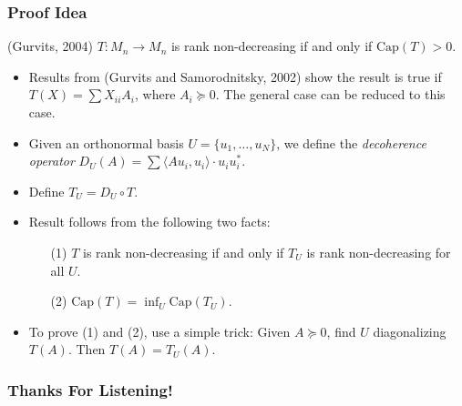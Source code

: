\documentclass[usenames,dvipsnames,12pt]{beamer}
\begin{document}
\begin{frame}
    \frametitle{Proof Idea}

    (Gurvits, 2004) $T: M_n \to M_n$ is rank non-decreasing if and only if $\text{Cap}(T) > 0$.

    \begin{itemize}
        \pause
        \item Results from (Gurvits and Samorodnitsky, 2002) show the result is true if $T(X) = \sum X_{ii} A_i$, where $A_i \succeq 0$. The general case can be reduced to this case.

        \pause
        \item Given an orthonormal basis $U = \{ u_1, \dots, u_N \}$, we define the \emph{decoherence operator} $D_U(A) = \sum \langle Au_i, u_i \rangle \cdot u_i u_i^*$.

        \pause
        \item Define $T_U = D_U \circ T$.

        \pause
        \item Result follows from the following two facts:
        \begin{itemize}
            \pause
            \item[(1)] $T$ is rank non-decreasing if and only if $T_U$ is rank non-decreasing for all $U$.
            
            \pause
            \item[(2)] $\text{Cap}(T) = \inf_U \text{Cap}(T_U)$.
        \end{itemize}

        \pause
        \item To prove (1) and (2), use a simple trick: Given $A \succeq 0$, find $U$ diagonalizing $T(A)$. Then $T(A) = T_U(A)$.
    \end{itemize}
\end{frame}


\begin{frame}
    \frametitle{Thanks For Listening!}
\end{frame}
\end{document}
